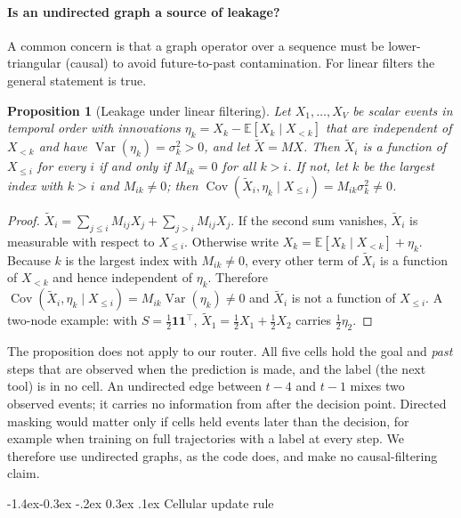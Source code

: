 \documentclass[10pt,twocolumn,letterpaper]{article}
\makeatletter
\renewcommand\subsection{\@startsection{subsection}{2}{\z@}%
  {-1.4ex\@plus -0.3ex \@minus -.2ex}%
  {0.3ex \@plus .1ex}%
  {\normalfont\normalsize\bfseries}}
\newtheorem{proposition}{Proposition}
\makeatother
\begin{document}
\paragraph{Is an undirected graph a source of leakage?} A common concern is that a graph operator over a sequence must be lower-triangular (causal) to avoid future-to-past contamination. For linear filters the general statement is true.
\begin{proposition}[Leakage under linear filtering]\label{prop:leakage}
Let $X_1,\dots,X_V$ be scalar events in temporal order with innovations $\eta_k = X_k - \mathbb{E}[X_k \mid X_{<k}]$ that are independent of $X_{<k}$ and have $\operatorname{Var}(\eta_k)=\sigma_k^2>0$, and let $\tilde X = MX$. Then $\tilde X_i$ is a function of $X_{\le i}$ for every $i$ if and only if $M_{ik}=0$ for all $k>i$. If not, let $k$ be the largest index with $k>i$ and $M_{ik}\ne0$; then $\operatorname{Cov}(\tilde X_i, \eta_k \mid X_{\le i}) = M_{ik}\sigma_k^2 \ne 0$.
\end{proposition}
\begin{proof}
$\tilde X_i = \sum_{j\le i} M_{ij}X_j + \sum_{j>i} M_{ij}X_j$. If the second sum vanishes, $\tilde X_i$ is measurable with respect to $X_{\le i}$. Otherwise write $X_k = \mathbb{E}[X_k\mid X_{<k}] + \eta_k$. Because $k$ is the largest index with $M_{ik}\neq 0$, every other term of $\tilde X_i$ is a function of $X_{<k}$ and hence independent of $\eta_k$. Therefore $\operatorname{Cov}(\tilde X_i,\eta_k\mid X_{\le i}) = M_{ik}\operatorname{Var}(\eta_k) \neq 0$ and $\tilde X_i$ is not a function of $X_{\le i}$. A two-node example: with $S = \tfrac12\mathbf{1}\mathbf{1}^\top$, $\tilde X_1 = \tfrac12 X_1 + \tfrac12 X_2$ carries $\tfrac12\eta_2$.
\end{proof}
The proposition does not apply to our router. All five cells hold the goal and \emph{past} steps that are observed when the prediction is made, and the label (the next tool) is in no cell. An undirected edge between $t{-}4$ and $t{-}1$ mixes two observed events; it carries no information from after the decision point. Directed masking would matter only if cells held events later than the decision, for example when training on full trajectories with a label at every step. We therefore use undirected graphs, as the code does, and make no causal-filtering claim.

\subsection{Cellular update rule}\label{sec:update}
\end{document}
